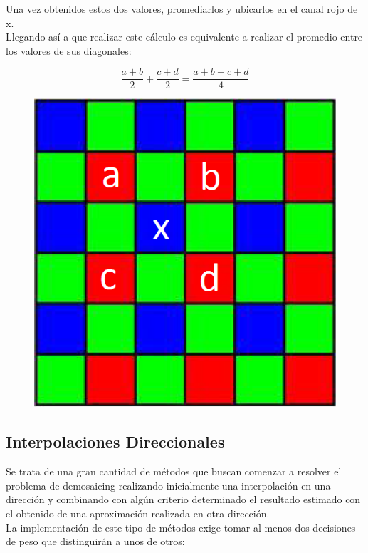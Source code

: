 \documentclass[a4paper]{article}
\begin{document}
Una vez obtenidos estos dos valores, promediarlos y ubicarlos en el canal rojo de x.\\

Llegando as\'i a que realizar este c\'alculo es equivalente a realizar el promedio entre los valores de sus diagonales:

\[
 \frac{a+b}{2} + \frac{c+d}{2} = \frac{a+b+c+d}{4}
\]

\begin{figure}[h!]
	\caption{}
	\begin{center}
	\includegraphics[scale=0.36]{imagenes/bilineal}
	\label{bilineal}
  \end{center}
\end{figure}

\newpage
\subsection{Interpolaciones Direccionales}
Se trata de una gran cantidad de métodos que buscan comenzar a resolver el problema de demosaicing realizando inicialmente una interpolación en una dirección y combinando con algún criterio determinado el resultado estimado con el obtenido de una aproximación realizada en otra dirección.\\

La implementación de este tipo de métodos exige tomar al menos dos decisiones de peso que distinguirán a unos de otros:\\
\end{document}

